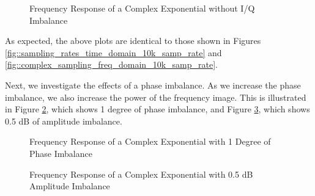\documentclass{article}
\begin{document}
\begin{figure}[H]
	\centerline{}
	\caption{Frequency Response of a Complex Exponential without I/Q Imbalance}
	\label{fig::iq_imbalance_0_mag_0_phase_freq}
\end{figure}

As expected, the above plots are identical to those shown in Figures \ref{fig::sampling_rates_time_domain_10k_samp_rate} and  \ref{fig::complex_sampling_freq_domain_10k_samp_rate}.

Next, we investigate the effects of a phase imbalance. As we increase the phase imbalance, we also increase the power of the frequency image. This is illustrated in Figure \ref{fig::iq_imbalance_0_mag_1_phase_freq}, which shows 1 degree of phase imbalance, and Figure \ref{fig::iq_imbalance_0p5_mag_0_phase_freq}, which shows 0.5 dB of amplitude imbalance.

\begin{figure}[H]
	\centerline{}
	\caption{Frequency Response of a Complex Exponential with 1 Degree of Phase Imbalance}
	\label{fig::iq_imbalance_0_mag_1_phase_freq}
\end{figure}

\begin{figure}[H]
	\centerline{}
	\caption{Frequency Response of a Complex Exponential with 0.5 dB Amplitude Imbalance}
	\label{fig::iq_imbalance_0p5_mag_0_phase_freq}
\end{figure}
\end{document}

